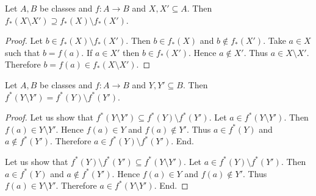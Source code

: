 \documentclass[10pt]{article}
\begin{document}
  \begin{forthel}
    \begin{proposition}[id=FOUNDATIONS_07_8372256617005056,printid]
      Let $A, B$ be classes and $f : A \to B$ and $X, X' \subseteq A$.
      Then $f_{*}(X \setminus X') \supseteq f_{*}(X) \setminus f_{*}(X')$.
    \end{proposition}
    \begin{proof}
      Let $b \in f_{*}(X) \setminus f_{*}(X')$.
      Then $b \in f_{*}(X)$ and $b \notin f_{*}(X')$.
      Take $a \in X$ such that $b = f(a)$.
      If $a \in X'$ then $b \in f_{*}(X')$.
      Hence $a \notin X'$.
      Thus $a \in X \setminus X'$.
      Therefore $b = f(a) \in f_{*}(X \setminus X')$.
    \end{proof}
  \end{forthel}

  \begin{forthel}
    \begin{proposition}[id=FOUNDATIONS_07_6552168641331200,printid]
      Let $A, B$ be classes and $f : A \to B$ and $Y, Y' \subseteq B$.
      Then $f^{*}(Y \setminus Y') = f^{*}(Y) \setminus f^{*}(Y')$.
    \end{proposition}
    \begin{proof}
      Let us show that $f^{*}(Y \setminus Y') \subseteq f^{*}(Y) \setminus f^{*}(Y')$.
        Let $a \in f^{*}(Y \setminus Y')$.
        Then $f(a) \in Y \setminus Y'$.
        Hence $f(a) \in Y$ and $f(a) \notin Y'$.
        Thus $a \in f^{*}(Y)$ and $a \notin f^{*}(Y')$.
        Therefore $a \in f^{*}(Y) \setminus f^{*}(Y')$.
      End.

      Let us show that $f^{*}(Y) \setminus f^{*}(Y') \subseteq f^{*}(Y \setminus Y')$.
        Let $a \in f^{*}(Y) \setminus f^{*}(Y')$.
        Then $a \in f^{*}(Y)$ and $a \notin f^{*}(Y')$.
        Hence $f(a) \in Y$ and $f(a) \notin Y'$.
        Thus $f(a) \in Y \setminus Y'$.
        Therefore $a \in f^{*}(Y \setminus Y')$.
      End.
    \end{proof}
  \end{forthel}
\end{document}

